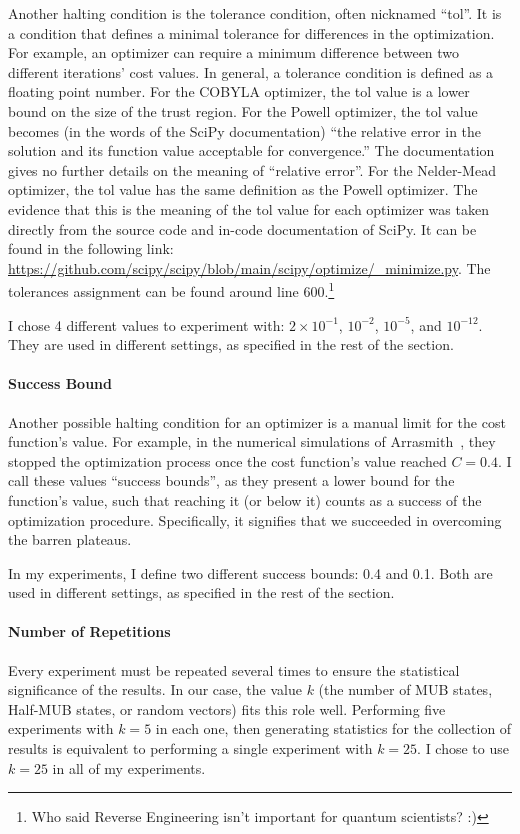 \documentclass[a4paper,12pt]{article}
\newcommand{\e}[1]{ 10^{#1}}
\begin{document}
Another halting condition is the tolerance condition, often nicknamed ``tol''.
It is a condition that defines a minimal tolerance for differences in the optimization.
For example, an optimizer can require a minimum difference between two different iterations' cost values.
In general, a tolerance condition is defined as a floating point number.
For the COBYLA optimizer, the tol value is a lower bound on the size of the trust region.
For the Powell optimizer, the tol value becomes (in the words of the SciPy documentation) ``the relative error in the solution and its function value acceptable for convergence.'' The documentation gives no further details on the meaning of ``relative error''.
For the Nelder-Mead optimizer, the tol value has the same definition as the Powell optimizer.
The evidence that this is the meaning of the tol value for each optimizer was taken directly from the source code and in-code documentation of SciPy.
It can be found in the following link: \url{https://github.com/scipy/scipy/blob/main/scipy/optimize/_minimize.py}. The tolerances assignment can be found around line 600.\footnote{Who said Reverse Engineering isn't important for quantum scientists? :)}

I chose 4 different values to experiment with: $2 \times \e{-1}$, $\e{-2}$, $\e{-5}$, and $\e{-12}$. They are used in different settings, as specified in the rest of the section.

\paragraph*{Success Bound}
Another possible halting condition for an optimizer is a manual limit for the cost function's value.
For example, in the numerical simulations of Arrasmith~\cite{arrasmith_effect_2021}, they stopped the optimization process once the cost function's value reached $C=0.4$.
I call these values ``success bounds'', as they present a lower bound for the function's value, such that reaching it (or below it) counts as a success of the optimization procedure. Specifically, it signifies that we succeeded in overcoming the barren plateaus.

In my experiments, I define two different success bounds: 0.4 and 0.1.
Both are used in different settings, as specified in the rest of the section.

\paragraph*{Number of Repetitions}
Every experiment must be repeated several times to ensure the statistical significance of the results. In our case, the value $k$ (the number of MUB states, Half-MUB states, or random vectors) fits this role well.
Performing five experiments with $k=5$ in each one, then generating statistics for the collection of results is equivalent to performing a single experiment with $k=25$.
I chose to use $k=25$ in all of my experiments.
\end{document}
